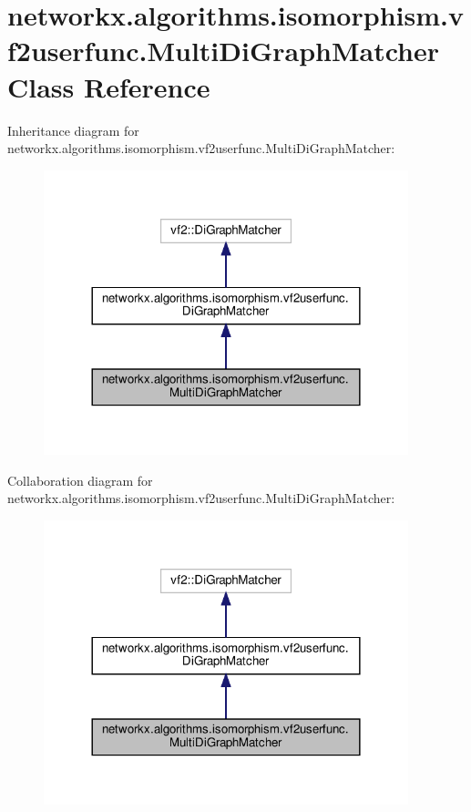 \hypertarget{classnetworkx_1_1algorithms_1_1isomorphism_1_1vf2userfunc_1_1MultiDiGraphMatcher}{}\section{networkx.\+algorithms.\+isomorphism.\+vf2userfunc.\+Multi\+Di\+Graph\+Matcher Class Reference}
\label{classnetworkx_1_1algorithms_1_1isomorphism_1_1vf2userfunc_1_1MultiDiGraphMatcher}


Inheritance diagram for networkx.\+algorithms.\+isomorphism.\+vf2userfunc.\+Multi\+Di\+Graph\+Matcher\+:
\nopagebreak
\begin{figure}[H]
\begin{center}
\leavevmode
\includegraphics[width=300pt]{classnetworkx_1_1algorithms_1_1isomorphism_1_1vf2userfunc_1_1MultiDiGraphMatcher__inherit__graph}
\end{center}
\end{figure}


Collaboration diagram for networkx.\+algorithms.\+isomorphism.\+vf2userfunc.\+Multi\+Di\+Graph\+Matcher\+:
\nopagebreak
\begin{figure}[H]
\begin{center}
\leavevmode
\includegraphics[width=300pt]{classnetworkx_1_1algorithms_1_1isomorphism_1_1vf2userfunc_1_1MultiDiGraphMatcher__coll__graph}
\end{center}
\end{figure}
